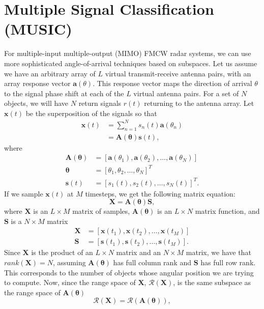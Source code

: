 \section{Multiple Signal Classification (MUSIC)}
For multiple-input multiple-output (MIMO) FMCW radar systems, we can use more
sophisticated angle-of-arrival techniques based on subspaces. Let
us assume we have an arbitrary array of $L$ virtual transmit-receive antenna pairs, with an
array response vector $\bm{a}(\theta)$. This response vector maps the direction
of arrival $\theta$ to the signal phase shift at each of the $L$ virtual antenna
pairs. For a set of $N$ objects, we will have $N$ return signals $r(t)$
returning to the antenna array. Let $\bm{x}(t)$ be the superposition of the
signals so that \cite{bresler2017hilbert}
\begin{align}
	\bm{x}(t) &= \sum_{n=1}^N s_n(t) \bm{a}(\theta_n)\\
	&= \bm{A}(\bm{\theta})\bm{s}(t),
\end{align}
where
\begin{align}
	\bm{A}(\bm{\theta}) &= [\bm{a}(\theta_1), \bm{a}(\theta_2), \dots, \bm{a}(\theta_N)]\\
	\bm{\theta} &= [\theta_1, \theta_2, \dots, \theta_N]^T\\
	\bm{s}(t) &= [s_1(t), s_2(t), \dots, s_N(t)]^T.
\end{align}
If we sample $\bm{x}(t)$ at $M$ timesteps, we get the following matrix equation:
\begin{equation}
	\bm{X} = \bm{A}(\bm{\theta})\bm{S},
\end{equation}
where $\bm{X}$ is an $L \times M$ matrix of samples, $\bm{A}(\bm{\theta})$ is
an
$L\times N$ matrix function, and $\bm{S}$ is a $N\times M$ matrix
\begin{align}
	\bm{X} &= [\bm{x}(t_1), \bm{x}(t_2), \dots, \bm{x}(t_M)]\\
	\bm{S} &= [\bm{s}(t_1), \bm{s}(t_2), \dots, \bm{s}(t_M)].
\end{align}
Since $\bm{X}$ is the product of an $L\times N$ matrix and an $N\times M$ matrix,
we have that $rank(\bm{X}) = N$, assuming $\bm{A}(\bm{\theta})$ has full column
rank and $\bm{S}$ has full row rank. This corresponds to the number of objects
whose angular position we are trying to compute. Now, since the range space of
$\bm{X}$, $\mathcal{R}(\bm{X})$, is the same subspace as the range space of
$\bm{A}(\bm{\theta})$
\begin{equation}
	\mathcal{R}(\bm{X}) = \mathcal{R}(\bm{A}(\bm{\theta})),
\end{equation}

